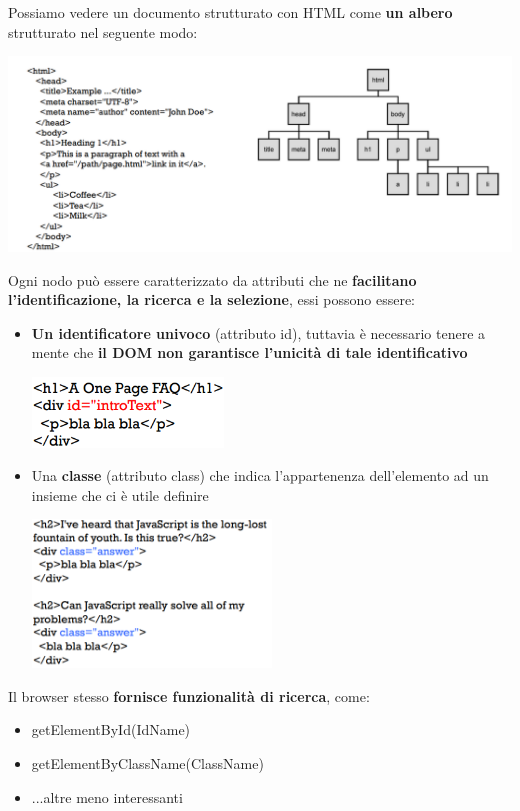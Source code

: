 \documentclass[12pt]{article}
\begin{document}
Possiamo vedere un documento strutturato con HTML come \textbf{un albero} strutturato nel seguente modo:
\begin{center}
    \includegraphics[width = 1.10\textwidth]{Images/154.PNG}
\end{center}
Ogni nodo può essere caratterizzato da attributi che ne \textbf{facilitano l'identificazione, la ricerca e la selezione}, essi possono essere:
\begin{itemize}
    \item \textbf{Un identificatore univoco} (attributo id), tuttavia è necessario tenere a mente che \textbf{il DOM non garantisce l'unicità di tale identificativo}
    \begin{center}
        \includegraphics[width = 0.40\textwidth]{Images/155.PNG}
    \end{center}
    \item Una \textbf{classe} (attributo class) che indica l'appartenenza dell'elemento ad un insieme che ci è utile definire
    \begin{center}
        \includegraphics[width = 0.50\textwidth]{Images/156.PNG}
    \end{center}
\end{itemize}
Il browser stesso \textbf{fornisce funzionalità di ricerca}, come:
\begin{itemize}
    \item getElementById(IdName)
    \item getElementByClassName(ClassName)
    \item ...altre meno interessanti
\end{itemize}
\end{document}
